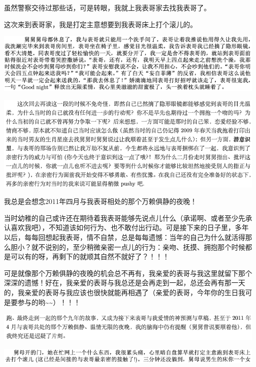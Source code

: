 \documentclass[9pt, b5paper]{article}
\begin{document}
虽然警察交待过那些话，可是转眼，我就上我表哥家去找我表哥了。 

这次来到表哥家，我是打定主意想要到我表哥床上打个滚儿的。

\begin{center}
\includegraphics[width=.9\linewidth]{./pic/p1p54.png}
\end{center}

\begin{center}
\includegraphics[width=.9\linewidth]{./pic/backups_plans_20210506_125630.png}
\end{center}

我总是会想念2011年四月与我表哥相处的那个万赖俱静的夜晚！

当时幼稚的自己或许还在期待着我表哥能够先说点儿什么（承诺啊、或者至少先承认喜欢我吧），不知道该如何行为、也不敢付出行动。可是接下来的日子里，多年以后，每每回想起我表哥，情不自禁，总是每每遗憾：当年的自己为什么就活得那么胆小？就不说别的，至少稍微亲密一点儿的行为：亲吻、抚摸、拥抱那个时候都是可以有的呀，再剩下的就顺其自然不就好了？！！！

可是就像那个万赖俱静的夜晚的机会总不再有，我亲爱的表哥与我这里就留下那个深深的遗憾！好在，我亲爱的表哥与我总还是会再走到一起，总还会再有那一天的，我亲爱的表哥与我应该也很快就能再相遇了（亲爱的表哥，今年你的生日我可是要参与的哟\textasciitilde{}\textasciitilde{}）！！！

\begin{center}
\includegraphics[width=.9\linewidth]{./pic/backups_plans_20210506_125428.png}
\end{center}

\begin{center}
\includegraphics[width=.9\linewidth]{./pic/backups_plans_20210505_213416.png}
\end{center}
\end{document}
